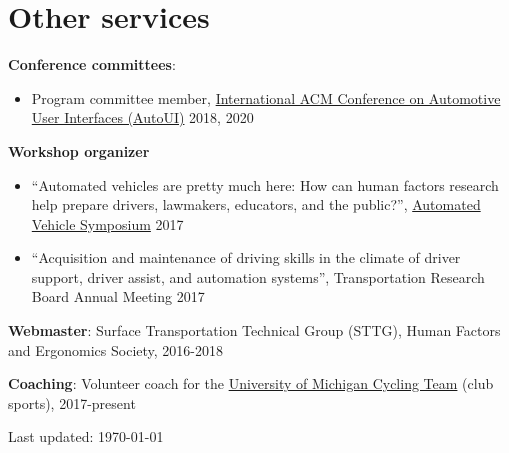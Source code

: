 \documentclass[11pt]{article}
\newenvironment{main}
{\begin{adjustwidth}{3em}{}}
{\end{adjustwidth}}
\begin{document}
\section*{Other services}
\begin{main}

\textbf{Conference committees}: 
\begin{itemize}
    \item Program committee member, \href{www.auto-ui.org}{International ACM Conference on Automotive User Interfaces (AutoUI)} 2018, 2020
\end{itemize}

\textbf{Workshop organizer}
\begin{itemize}
    \item “Automated vehicles are pretty much here: How can human factors research help prepare drivers, lawmakers, educators, and the public?”, \href{www.automatedvehiclessymposium.org}{Automated Vehicle Symposium} 2017
    \item “Acquisition and maintenance of driving skills in the climate of driver support, driver assist, and automation systems”, Transportation Research Board Annual Meeting 2017
\end{itemize}

\textbf{Webmaster}: Surface Transportation Technical Group (STTG), Human Factors and Ergonomics Society, 2016-2018

\textbf{Coaching}: Volunteer coach for the \href{https://www.umcycling.org/}{University of Michigan Cycling Team} (club sports), 2017-present

\vfill\hfill
Last updated: \today

\end{main}
\end{document}
